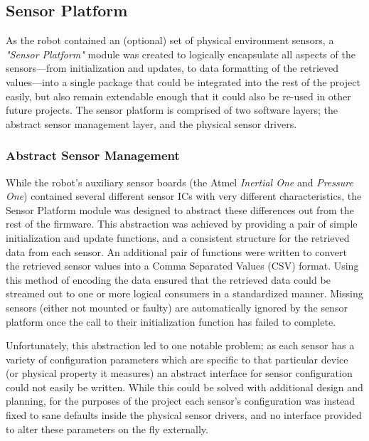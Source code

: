 \FloatBarrier
\subsection{Sensor Platform}

As the robot contained an (optional) set of physical environment sensors, a \textit{"Sensor Platform"} module was created to logically encapsulate all aspects of the sensors---from initialization and updates, to data formatting of the retrieved values---into a single package that could be integrated into the rest of the project easily, but also remain extendable enough that it could also be re-used in other future projects. The sensor platform is comprised of two software layers; the abstract sensor management layer, and the physical sensor drivers.

\FloatBarrier
\subsubsection{Abstract Sensor Management}

While the robot's auxiliary sensor boards (the Atmel \textit{Inertial One} and \textit{Pressure One}) contained several different sensor ICs with very different characteristics, the Sensor Platform module was designed to abstract these differences out from the rest of the firmware. This abstraction was achieved by providing a pair of simple initialization and update functions, and a consistent structure for the retrieved data from each sensor. An additional pair of functions were written to convert the retrieved sensor values into a Comma Separated Values (CSV) format. Using this method of encoding the data ensured that the retrieved data could be streamed out to one or more logical consumers in a standardized manner. Missing sensors (either not mounted or faulty) are automatically ignored by the sensor platform once the call to their initialization function has failed to complete.

Unfortunately, this abstraction led to one notable problem; as each sensor has a variety of configuration parameters which are specific to that particular device (or physical property it measures) an abstract interface for sensor configuration could not easily be written. While this could be solved with additional design and planning, for the purposes of the project each sensor's configuration was instead fixed to sane defaults inside the physical sensor drivers, and no interface provided to alter these parameters on the fly externally.

